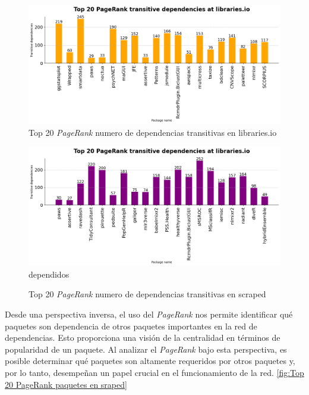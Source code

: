 \begin{figure}[h!]
    \begin{center}
        \includegraphics[width=1\textwidth]{img/cran/pr_trans.png}
        \caption{Top 20 \textit{PageRank} numero de dependencias transitivas en libraries.io}
        \label{fig:Top 20 PageRank numero de dependencias transitivas en libraries.io}
    \end{center}
\end{figure}

\begin{figure}[h!]
    \begin{center}
        \includegraphics[width=1\textwidth]{img/cran/pr_trans2.png}dependidos
        \caption{Top 20 \textit{PageRank} numero de dependencias transitivas en scraped}
        \label{fig:Top 20 PageRank numero de dependencias transitivas en scraped}
    \end{center}
\end{figure}

Desde una perspectiva inversa, el uso del \textit{PageRank} nos permite identificar qué paquetes son dependencia
de otros paquetes importantes en la red de dependencias. Esto proporciona una visión de
la centralidad en términos de popularidad de un paquete. Al analizar el \textit{PageRank} bajo esta perspectiva, es
posible determinar qué paquetes son altamente requeridos por otros paquetes y, por lo tanto,
desempeñan un papel crucial en el funcionamiento de la red. \ref{fig:Top 20 PageRank paquetes en sraped}

